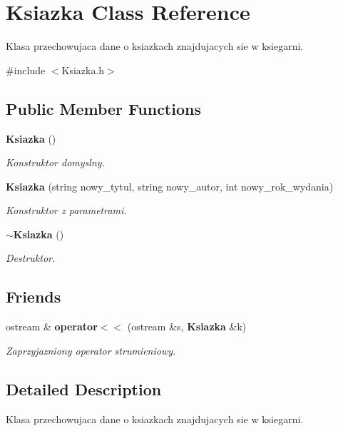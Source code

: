 \section{Ksiazka Class Reference}
\label{class_ksiazka}


Klasa przechowujaca dane o ksiazkach znajdujacych sie w ksiegarni.  




{\ttfamily \#include $<$Ksiazka.\+h$>$}

\subsection*{Public Member Functions}
\begin{DoxyCompactItemize}
\item 
\textbf{ Ksiazka} ()
\begin{DoxyCompactList}\small\item\em Konstruktor domyslny. \end{DoxyCompactList}\item 
\textbf{ Ksiazka} (string nowy\+\_\+tytul, string nowy\+\_\+autor, int nowy\+\_\+rok\+\_\+wydania)
\begin{DoxyCompactList}\small\item\em Konstruktor z parametrami. \end{DoxyCompactList}\item 
\textbf{ $\sim$\+Ksiazka} ()
\begin{DoxyCompactList}\small\item\em Destruktor. \end{DoxyCompactList}\end{DoxyCompactItemize}
\subsection*{Friends}
\begin{DoxyCompactItemize}
\item 
ostream \& \textbf{ operator$<$$<$} (ostream \&s, \textbf{ Ksiazka} \&k)
\begin{DoxyCompactList}\small\item\em Zaprzyjazniony operator strumieniowy. \end{DoxyCompactList}\end{DoxyCompactItemize}


\subsection{Detailed Description}
Klasa przechowujaca dane o ksiazkach znajdujacych sie w ksiegarni. 


